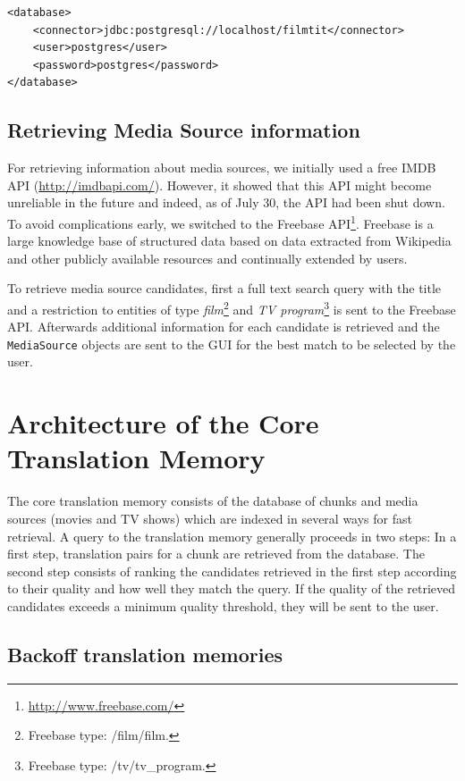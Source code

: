 \begin{lstlisting}
<database>
    <connector>jdbc:postgresql://localhost/filmtit</connector>
    <user>postgres</user>
    <password>postgres</password>
</database>
\end{lstlisting}


\subsection{Retrieving Media Source information}

For retrieving information about media sources, we initially used a free IMDB API (\url{http://imdbapi.com/}). However, it showed that this API might become unreliable in the future and indeed, as of July 30, the API had been shut down. To avoid complications early, we switched to the Freebase API\footnote{\url{http://www.freebase.com/}}. Freebase is a large knowledge base of structured data based on data extracted from Wikipedia and other publicly available resources and continually extended by users.

To retrieve media source candidates, first a full text search query with the title and a restriction to entities of type \emph{film}\footnote{Freebase type: /film/film.} and \emph{TV program}\footnote{Freebase type: /tv/tv\_program.} is sent to the Freebase API. Afterwards additional information for each candidate is retrieved and the {\tt MediaSource} objects are sent to the GUI for the best match to be selected by the user.



\section{Architecture of the Core Translation Memory}
\label{sec:corearchitecture}

The core translation memory consists of the database of chunks and media
sources (movies and TV shows) which are indexed in several ways for fast
retrieval. A query to the translation memory generally proceeds in two
steps: In a first step, translation pairs for a chunk are retrieved from
the database. The second step consists of ranking the candidates
retrieved in the first step according to their quality and how well they
match the query. If the quality of the retrieved candidates exceeds a
minimum quality threshold, they will be sent to the user.

\subsection{Backoff translation memories}

